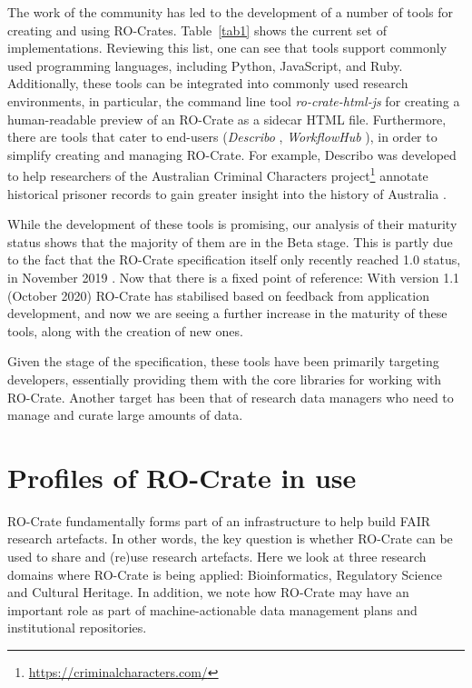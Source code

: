 \documentclass[ds,v1.1.2,openaccess]{iosart2x}%
\begin{document}
The work of the community has led to the development of a number of
tools for creating and using RO-Crates. Table~\ref{tab1} shows the current set
of implementations. Reviewing this list, one can see that tools support
commonly used programming languages, including Python, JavaScript, and
Ruby. Additionally, these tools can be integrated into commonly used
research environments, in particular, the command line tool
\textit{ro-crate-html-js} \cite{ro-crate-html-js} for creating a human-readable
preview of an RO-Crate as a sidecar HTML file. Furthermore, there are
tools that cater to end-users (\textit{Describo} \cite{describo}, \textit{WorkflowHub}
\cite{about-workflowhub}), in order to simplify creating and managing
RO-Crate. For example, Describo was developed to help researchers of
the Australian Criminal Characters
project\footnote{\url{https://criminalcharacters.com/}} annotate historical prisoner
records to gain greater insight into the history of Australia
\cite{doi:10.1080/14490854.2020.1796500}.

While the development of these tools is promising, our analysis of
their maturity status shows that the majority of them are in the Beta
stage. This is partly due to the fact that the RO-Crate specification
itself only recently reached 1.0 status, in November 2019
\cite{doi:10.5281/zenodo.3541888}. Now that there is a fixed point of
reference: With version 1.1 (October 2020)
\cite{doi:10.5281/zenodo.4031327} RO-Crate has stabilised based on feedback
from application development, and now we are seeing a further increase
in the maturity of these tools, along with the creation of new ones.

Given the stage of the specification, these tools have been primarily
targeting developers, essentially providing them with the core
libraries for working with RO-Crate. Another target has been that of
research data managers who need to manage and curate large amounts of data.

\section{Profiles of RO-Crate in use}%

\label{sec:inuse}

RO-Crate fundamentally forms part of an infrastructure to help build
FAIR research artefacts. In other words, the key question is whether
RO-Crate can be used to share and (re)use research artefacts. Here we
look at three research domains where RO-Crate is being applied:
Bioinformatics, Regulatory Science and Cultural Heritage. In addition,
we note how RO-Crate may have an important role as part of
machine-actionable data management plans and institutional repositories.
\end{document}

